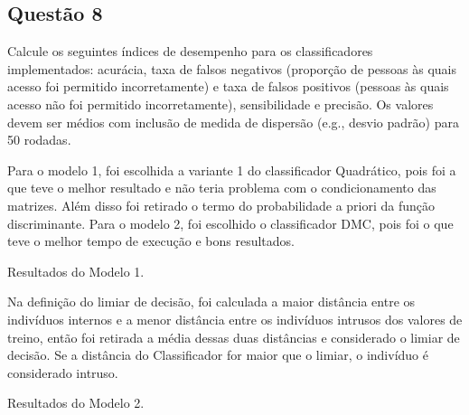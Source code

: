 \documentclass[a4paper,12pt]{article}
\newcommand{\nonumsubsection}[1]{%
  \subsection*{#1}%
  \addcontentsline{toc}{subsection}{#1}%
}
\begin{document}
\nonumsubsection{Questão 8}
\begin{tcolorbox}[colback=blue!5!white, colframe=blue!75!black]
    Calcule os seguintes índices de desempenho para os classificadores implementados:
     acurácia, taxa de falsos negativos (proporção de pessoas às quais acesso foi permitido incorretamente)
      e taxa de falsos positivos (pessoas às quais acesso não foi permitido incorretamente), sensibilidade e precisão. Os valores devem ser médios com inclusão de medida de dispersão (e.g., desvio padrão) para 50 rodadas.
\end{tcolorbox}
Para o modelo 1, foi escolhida a variante 1 do classificador Quadrático,
 pois foi a que teve o melhor resultado e não teria problema com o condicionamento das matrizes. Além disso foi retirado o termo do probabilidade a priori da função discriminante.
Para o modelo 2, foi escolhido o classificador DMC, pois foi o que teve o melhor tempo de execução e bons resultados.
\begin{table}[H]
\centering

\caption{Resultados do Modelo 1.}
\end{table}
Na definição do limiar de decisão, foi calculada a maior distância entre os indivíduos internos e a menor distância entre os indivíduos intrusos dos valores de treino,
então foi retirada a média dessas duas distâncias e considerado o limiar de decisão. Se a distância do Classificador for maior que o limiar, o indivíduo é considerado intruso.

\begin{table}[H]
\centering

\caption{Resultados do Modelo 2.}
\end{table}
\end{document}
